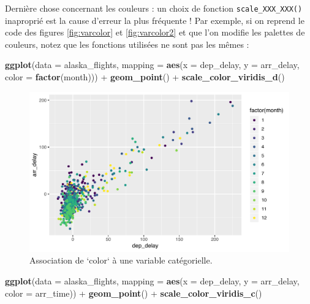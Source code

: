 \documentclass[
  a4paper,
]{article}
\newenvironment{Shaded}{\begin{snugshade}}{\end{snugshade}}
\newcommand{\DataTypeTok}[1]{\textcolor[rgb]{0.00,0.34,0.68}{#1}}
\newcommand{\KeywordTok}[1]{\textcolor[rgb]{0.12,0.11,0.11}{\textbf{#1}}}
\newcommand{\NormalTok}[1]{\textcolor[rgb]{0.12,0.11,0.11}{#1}}
\newcommand{\OperatorTok}[1]{\textcolor[rgb]{0.12,0.11,0.11}{#1}}
\newcommand{\StringTok}[1]{\textcolor[rgb]{0.75,0.01,0.01}{#1}}
\begin{document}
Dernière chose concernant les couleurs : un choix de fonction \texttt{scale\_XXX\_XXX()} inaproprié est la cause d'erreur la plus fréquente ! Par exemple, si on reprend le code des figures \ref{fig:varcolor} et \ref{fig:varcolor2} et que l'on modifie les palettes de couleurs, notez que les fonctions utilisées ne sont pas les mêmes :

\begin{Shaded}
\begin{Highlighting}[]
\KeywordTok{ggplot}\NormalTok{(}\DataTypeTok{data =}\NormalTok{ alaska_flights, }\DataTypeTok{mapping =} \KeywordTok{aes}\NormalTok{(}\DataTypeTok{x =}\NormalTok{ dep_delay, }\DataTypeTok{y =}\NormalTok{ arr_delay, }
                                            \DataTypeTok{color =} \KeywordTok{factor}\NormalTok{(month))) }\OperatorTok{+}
\StringTok{  }\KeywordTok{geom_point}\NormalTok{() }\OperatorTok{+}
\StringTok{  }\KeywordTok{scale_color_viridis_d}\NormalTok{()}
\end{Highlighting}
\end{Shaded}

\begin{figure}[htpb]

{\centering \includegraphics[width=0.9\linewidth]{figure/varcolorviridis-1} 

}

\caption{Association de `color` à une variable catégorielle.}\label{fig:varcolorviridis}
\end{figure}

\begin{Shaded}
\begin{Highlighting}[]
\KeywordTok{ggplot}\NormalTok{(}\DataTypeTok{data =}\NormalTok{ alaska_flights, }\DataTypeTok{mapping =} \KeywordTok{aes}\NormalTok{(}\DataTypeTok{x =}\NormalTok{ dep_delay, }\DataTypeTok{y =}\NormalTok{ arr_delay, }
                                            \DataTypeTok{color =}\NormalTok{ arr_time)) }\OperatorTok{+}
\StringTok{  }\KeywordTok{geom_point}\NormalTok{() }\OperatorTok{+}
\StringTok{  }\KeywordTok{scale_color_viridis_c}\NormalTok{()}
\end{Highlighting}
\end{Shaded}
\end{document}
